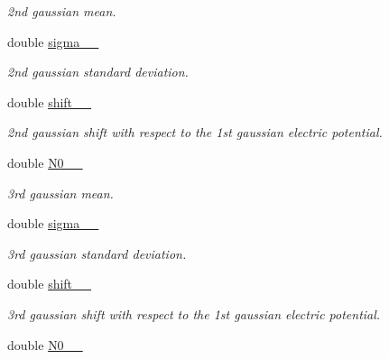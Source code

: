 \begin{DoxyCompactItemize}
\begin{DoxyCompactList}\small\item\em 2nd gaussian mean. \end{DoxyCompactList}\item 
\hypertarget{classParamList_a1743ba1b8d56ae8f3ab9256e6f8b62bd}{double \hyperlink{classParamList_a1743ba1b8d56ae8f3ab9256e6f8b62bd}{sigma\-\_\-\_\-}}\label{classParamList_a1743ba1b8d56ae8f3ab9256e6f8b62bd}

\begin{DoxyCompactList}\small\item\em 2nd gaussian standard deviation. \end{DoxyCompactList}\item 
\hypertarget{classParamList_a9ae72a20f59400fc96f9e33ed21dfb39}{double \hyperlink{classParamList_a9ae72a20f59400fc96f9e33ed21dfb39}{shift\-\_\-\_\-}}\label{classParamList_a9ae72a20f59400fc96f9e33ed21dfb39}

\begin{DoxyCompactList}\small\item\em 2nd gaussian shift with respect to the 1st gaussian electric potential. \end{DoxyCompactList}\item 
\hypertarget{classParamList_afa2f537bf13e1e3105ec91f9282c6dc6}{double \hyperlink{classParamList_afa2f537bf13e1e3105ec91f9282c6dc6}{N0\-\_\-\_\-}}\label{classParamList_afa2f537bf13e1e3105ec91f9282c6dc6}

\begin{DoxyCompactList}\small\item\em 3rd gaussian mean. \end{DoxyCompactList}\item 
\hypertarget{classParamList_a049c8b36c29fb765c363cf05610ca9e2}{double \hyperlink{classParamList_a049c8b36c29fb765c363cf05610ca9e2}{sigma\-\_\-\_\-}}\label{classParamList_a049c8b36c29fb765c363cf05610ca9e2}

\begin{DoxyCompactList}\small\item\em 3rd gaussian standard deviation. \end{DoxyCompactList}\item 
\hypertarget{classParamList_a29c887174f28cfa06e7ea7fd80185bd7}{double \hyperlink{classParamList_a29c887174f28cfa06e7ea7fd80185bd7}{shift\-\_\-\_\-}}\label{classParamList_a29c887174f28cfa06e7ea7fd80185bd7}

\begin{DoxyCompactList}\small\item\em 3rd gaussian shift with respect to the 1st gaussian electric potential. \end{DoxyCompactList}\item 
\hypertarget{classParamList_a2c548ad5a69cd791b80ba623accf50b3}{double \hyperlink{classParamList_a2c548ad5a69cd791b80ba623accf50b3}{N0\-\_\-\_\-}}\label{classParamList_a2c548ad5a69cd791b80ba623accf50b3}


\end{DoxyCompactItemize}
